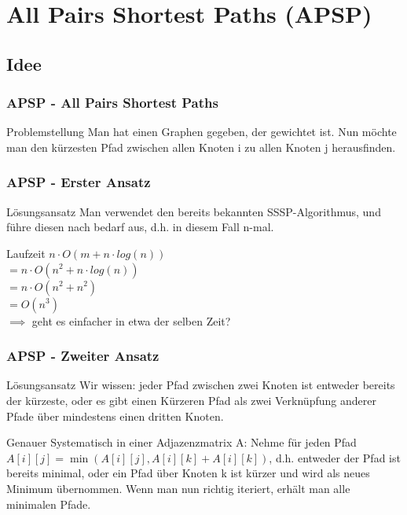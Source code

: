 \section{All Pairs Shortest Paths (APSP)} 

\subsection{Idee} 

\begin{frame}
\frametitle{APSP - All Pairs Shortest Paths}
\begin{block}{Problemstellung}
Man hat einen Graphen gegeben, der gewichtet ist. Nun möchte man den kürzesten Pfad zwischen allen Knoten i zu allen Knoten j herausfinden.
\end{block}
\end{frame}


\begin{frame}
\frametitle{APSP - Erster Ansatz}
\begin{block}{Lösungsansatz}
Man verwendet den bereits bekannten SSSP-Algorithmus, und führe diesen nach bedarf aus, d.h. in diesem Fall n-mal.
\end{block}

\begin{block}{Laufzeit}
$n \cdot O (m + n \cdot log(n))$\\$
= n \cdot O (n^2 + n \cdot log(n))$\\$ 
= n \cdot O (n^2 + n^2) $\\$ 
= O (n^3) $\\
$\implies$ geht es einfacher in etwa der selben Zeit?
\end{block}
\end{frame}


\begin{frame}
\frametitle{APSP - Zweiter Ansatz}
\begin{block}{Lösungsansatz}
Wir wissen: jeder Pfad zwischen zwei Knoten ist entweder bereits der kürzeste, oder es gibt einen Kürzeren Pfad als zwei Verknüpfung anderer Pfade über mindestens einen dritten Knoten.
\end{block}

\begin{block}{Genauer}
Systematisch in einer Adjazenzmatrix A:
Nehme für jeden Pfad $A[i][j] = \min\left(A[i][j], A[i][k] + A[i][k]\right)$, d.h. entweder der Pfad ist bereits minimal, oder ein Pfad über Knoten k ist kürzer und wird als neues Minimum übernommen.
Wenn man nun richtig iteriert, erhält man alle minimalen Pfade.
\end{block}
\end{frame}


